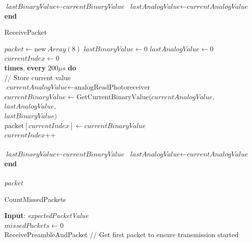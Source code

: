 \documentclass[letterpaper,10pt]{article}
\begin{document}
\begin{spacing}{1.15}
\begin{algorithm}[H]
\begin{algorithmic}[1]
		\State \quad $\textit{lastBinaryValue} \gets \textit{currentBinaryValue}$
		\State \quad $\textit{lastAnalogValue} \gets \textit{currentAnalogValue}$
		\State \textbf{end}		
	\end{algorithmic}
\end{algorithm}

\begin{algorithm}[H]
	\caption{ReceivePacket}\label{algo-3}
	\begin{algorithmic}[1]
		\State $\textit{packet} \gets \text{new}\ \textit{Array}(8)$
		\State $\textit{lastBinaryValue} \gets 0$
		\State $\textit{lastAnalogValue} \gets 0$
		\State $currentIndex \gets 0$\\
		
		 \textbf{times}, \textbf{every} $200 \mu s$ \textbf{do}\\
		\quad // Store current value\\
		\quad $\textit{currentAnalogValue} \gets \text{analogReadPhotoreceiver}$\\
		\quad $\textit{currentBinaryValue} \gets \text{GetCurrentBinaryValue}(\textit{currentAnalogValue},$\\ 
		\hspace{7.65cm} $\textit{lastAnalogValue},$\\
		\hspace{7.65cm} $\textit{lastBinaryValue})$ \\
		\quad $\text{packet}[\textit{currentIndex}] \gets \textit{currentBinaryValue}$\\
		\quad $\textit{currentIndex}\text{++}$\\\\
		
		\State \quad $\textit{lastBinaryValue} \gets \textit{currentBinaryValue}$
		\State \quad $\textit{lastAnalogValue} \gets \textit{currentAnalogValue}$
		\State \textbf{end}\\\\
		
		\Return \textit{packet}
	\end{algorithmic}
\end{algorithm}

\begin{algorithm}[H]
	\caption{CountMissedPackets}\label{algo-4}
	\begin{algorithmic}[1]
		\State \textbf{Input}: \textit{expectedPacketValue}\\
		\State $\textit{missedPackets} \gets 0$\\
		ReceivePreambleAndPacket // Get first packet to ensure transmission started
		

\end{algorithmic}
\end{algorithm}
\end{spacing}
\end{document}

